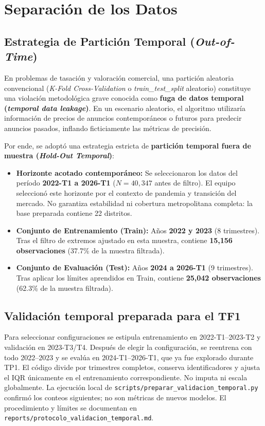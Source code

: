 \documentclass[11pt,a4paper]{article}
\begin{document}
\section{Separación de los Datos}

\subsection{Estrategia de Partición Temporal (\textit{Out-of-Time})}
En problemas de tasación y valoración comercial, una partición aleatoria convencional (\textit{K-Fold Cross-Validation} o \textit{train\_test\_split} aleatorio) constituye una violación metodológica grave conocida como \textbf{fuga de datos temporal (\textit{temporal data leakage})}. En un escenario aleatorio, el algoritmo utilizaría información de precios de anuncios contemporáneos o futuros para predecir anuncios pasados, inflando ficticiamente las métricas de precisión.

Por ende, se adoptó una estrategia estricta de \textbf{partición temporal fuera de muestra (\textit{Hold-Out Temporal})}:
\begin{itemize}[leftmargin=1.5cm]
    \item \textbf{Horizonte acotado contemporáneo:} Se seleccionaron los datos del período \textbf{2022-T1 a 2026-T1} ($N = 40,347$ antes de filtro). El equipo seleccionó este horizonte por el contexto de pandemia y transición del mercado. No garantiza estabilidad ni cobertura metropolitana completa: la base preparada contiene 22 distritos.
    \item \textbf{Conjunto de Entrenamiento (Train):} Años \textbf{2022 y 2023} (8 trimestres). Tras el filtro de extremos ajustado en esta muestra, contiene \textbf{15,156 observaciones} (37.7\% de la muestra filtrada).
    \item \textbf{Conjunto de Evaluación (Test):} Años \textbf{2024 a 2026-T1} (9 trimestres). Tras aplicar los límites aprendidos en Train, contiene \textbf{25,042 observaciones} (62.3\% de la muestra filtrada).
\end{itemize}

\subsection{Validación temporal preparada para el TF1}
Para seleccionar configuraciones se estipula entrenamiento en 2022-T1--2023-T2 y validación en 2023-T3/T4. Después de elegir la configuración, se reentrena con todo 2022--2023 y se evalúa en 2024-T1--2026-T1, que ya fue explorado durante TP1. El código divide por trimestres completos, conserva identificadores y ajusta el IQR únicamente en el entrenamiento correspondiente. No imputa ni escala globalmente. La ejecución local de \texttt{scripts/preparar\_validacion\_temporal.py} confirmó los conteos siguientes; no son métricas de nuevos modelos. El procedimiento y límites se documentan en \texttt{reports/protocolo\_validacion\_temporal.md}.
\end{document}

